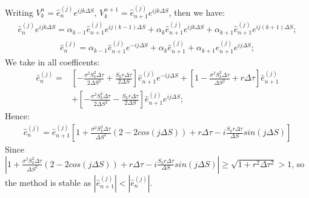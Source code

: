 \documentclass[final]{siamltex}
\begin{document}
Writing $V_k^n=\hat{e}_n^{(j)} e^{ijk\Delta S}$, $V_k^{n+1}=\hat{e}_{n+1}^{(j)} e^{ijk\Delta S}$, then we have:
\begin{equation}
\begin{split}
\hat{e}_n^{(j)} e^{ijk\Delta S} = \alpha _{k-1} \hat{e}_{n+1}^{(j)} e^{ij(k-1)\Delta S} + \alpha _k \hat{e}_{n+1}^{(j)} e^{ijk\Delta S} + \alpha _{k+1}\hat{e}_{n+1}^{(j)} e^{ij(k+1)\Delta S};
\end{split}
\end{equation}
\begin{equation}
\begin{split}
\hat{e}_n^{(j)}  = \alpha _{k-1} \hat{e}_{n+1}^{(j)} e^{-ij\Delta S} + \alpha _k \hat{e}_{n+1}^{(j)} + \alpha _{k+1}\hat{e}_{n+1}^{(j)} e^{ij\Delta S};
\end{split}
\end{equation}
We take in all coefficents:
\begin{equation}
\begin{split}
\hat{e}_n^{(j)}  = &[-\frac {\sigma^2 S_k^2 \Delta \tau}{2\Delta S^2} + \frac{S_k r \Delta \tau} {2\Delta S}] \hat{e}_{n+1}^{(j)} e^{-ij\Delta S} + [1 - \frac {\sigma^2 S_k^2 \Delta \tau}{\Delta S^2} + r \Delta \tau] \hat{e}_{n+1}^{(j)}\\ &+ [-\frac {\sigma^2 S_k^2 \Delta \tau}{2\Delta S^2}- \frac{S_k r \Delta \tau} {2\Delta S}]\hat{e}_{n+1}^{(j)} e^{ij\Delta S};
\end{split}
\end{equation}
Hence:
\begin{equation}
\begin{split}
\hat{e}_n^{(j)} = \hat{e}_{n+1}^{(j)}[1+\frac {\sigma^2 S_k^2 \Delta \tau}{\Delta S^2}(2-2cos(j\Delta S))+r\Delta \tau-i \frac{S_k r \Delta \tau} {\Delta S}sin(j\Delta S)]
\end{split}
\end{equation}
Since $|1+\frac {\sigma^2 S_k^2 \Delta \tau}{\Delta S^2}(2-2cos(j\Delta S))+r\Delta \tau-i \frac{S_k r \Delta \tau} {\Delta S}sin(j\Delta S)|\geq \sqrt{1 + r^2\Delta \tau^2}>1$, so the method is stable as $|\hat{e}_{n+1}^{(j)}|<|\hat{e}_{n}^{(j)}|$.

\end{document}
